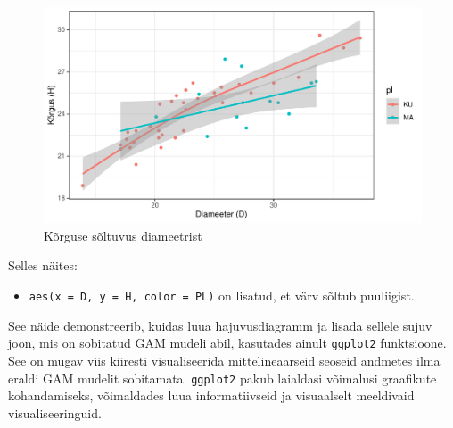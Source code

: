 \documentclass[
]{book}
\providecommand{\tightlist}{%
  \setlength{\itemsep}{0pt}\setlength{\parskip}{0pt}}
\begin{document}
\begin{figure}[H]
\includegraphics[width=0.8\linewidth]{_main_files/figure-latex/unnamed-chunk-79-1} \caption{Kõrguse sõltuvus diameetrist}\label{fig:unnamed-chunk-79}
\end{figure}

Selles näites:

\begin{itemize}
\tightlist
\item
  \texttt{aes(x\ =\ D,\ y\ =\ H,\ color\ =\ PL)} on lisatud, et värv sõltub puuliigist.
\end{itemize}

See näide demonstreerib, kuidas luua hajuvusdiagramm ja lisada sellele sujuv joon, mis on sobitatud GAM mudeli abil, kasutades ainult \texttt{ggplot2} funktsioone. See on mugav viis kiiresti visualiseerida mittelineaarseid seoseid andmetes ilma eraldi GAM mudelit sobitamata. \texttt{ggplot2} pakub laialdasi võimalusi graafikute kohandamiseks, võimaldades luua informatiivseid ja visuaalselt meeldivaid visualiseeringuid.


\end{document}
